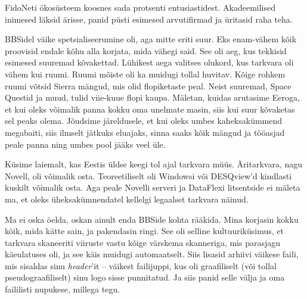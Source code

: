 
FidoNeti ökosüsteem koosnes sada 
protsenti entusiastidest. Akadeemilised inimesed läksid ärisse, panid püsti 
esimesed arvutifirmad ja üritasid raha teha. 


BBSidel väike spetsialiseerumine oli, aga mitte eriti suur. Eks 
enam-vähem kõik proovisid endale kõhu alla korjata, mida vähegi said. 
See oli aeg, kus tekkisid esimesed suuremad kõvakettad. 
Lühikest aega valitses olukord, kus tarkvara 
oli vähem kui ruumi. Ruumi mõiste oli ka muidugi tollal huvitav. Kõige 
rohkem ruumi võtsid Sierra mängud, mis olid flopiketaste peal. Neist suuremad, Space 
Questid ja muud, tulid viie-kuue flopi 
kaupa. Mäletan, kuidas arutasime Eeroga, et 
kui oleks võimalik panna kokku oma unelmate masin, siis kui suur kõvaketas sel 
peaks olema. Jõudsime järeldusele, et kui oleks umbes kaheksakümmend megabaiti, 
siis ilmselt jätkuks eluajaks, sinna saaks kõik mängud ja
tööasjad peale panna ning umbes pool jääks veel üle.


Küsime laiemalt, kas Eestis üldse keegi tol ajal tarkvara müüs. 
Äritarkvara, nagu Novell, oli võimalik osta. Teoreetiliselt oli 
Windowsi või DESQview'd kindlasti kuskilt võimalik osta. Aga peale Novelli serveri ja 
DataFlexi 
litsentside ei mäleta ma, et oleks üheksakümnendatel kellelgi 
legaalset tarkvara näinud. 


Ma ei oska öelda, oskan ainult enda BBSide kohta rääkida. \mbox{Mina} 
korjasin kokku kõik, mida kätte sain, ja pakendasin ringi. See 
oli selline kultuuriküsimus, et tarkvara skaneeriti viiruste vastu 
kõige värskema skanneriga, mis parasjagu käeulatuses oli, ja see käis 
muidugi automaatselt. Siis lisasid arhiivi väikese faili, 
mis sisaldas sinu \emph{header}'it -- väikest 
failijuppi, kus oli graafiliselt (või tollal pseudo{\-}graafiliselt) sinu 
logo sisse punnitatud. Ja siis panid selle välja ja oma faililisti nupukese, 
millega tegu. 

